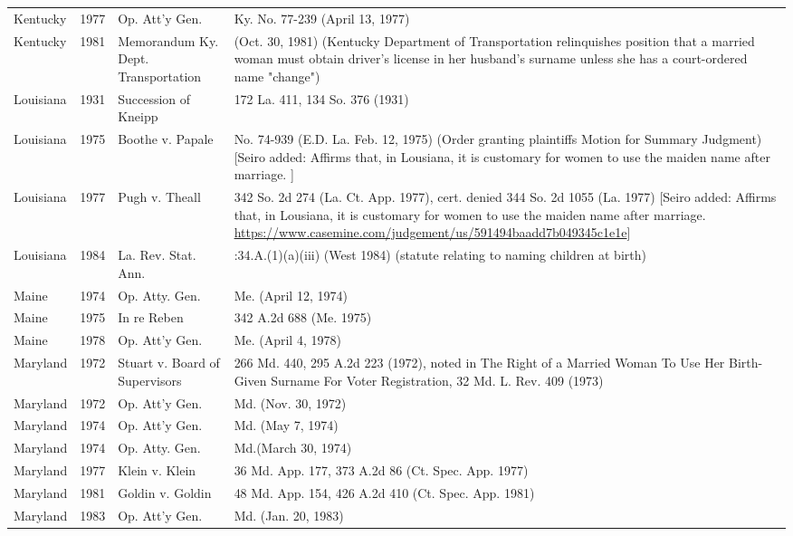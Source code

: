 \begin{longtable}{>{\hfill\footnotesize }p{2.5cm}<{}>{\footnotesize }p{0.75cm}<{}>{\footnotesize }p{4cm}<{}>{\footnotesize }p{6cm}<{}}
Kentucky & 1977 & Op. Att'y Gen. & Ky. No. 77-239 (April 13, 1977)\\\rowcolor{gray90}
Kentucky & 1981 & Memorandum Ky. Dept. Transportation & (Oct. 30, 1981) (Kentucky Department of Transportation relinquishes position that a married woman must obtain driver's license in her husband's surname unless she has a court-ordered name "change")\\
Louisiana & 1931 & Succession of Kneipp & 172 La. 411, 134 So. 376 (1931)\\\rowcolor{gray90}
Louisiana & 1975 & Boothe v. Papale & No. 74-939 (E.D. La. Feb. 12, 1975) (Order granting plaintiffs Motion for Summary Judgment) [Seiro added: Affirms that, in Lousiana, it is customary for women to use the maiden name after marriage. \citep[][fn 54]{Gorence1976}]\\
Louisiana & 1977 & Pugh v. Theall & 342 So. 2d 274 (La. Ct. App. 1977), cert. denied 344 So. 2d 1055 (La. 1977) [Seiro added: Affirms that, in Lousiana, it is customary for women to use the maiden name after marriage. \url{https://www.casemine.com/judgement/us/591494baadd7b049345c1e1e}]\\\rowcolor{gray90}
Louisiana & 1984 & La. Rev. Stat. Ann. & \textsection 40:34.A.(1)(a)(iii) (West 1984) (statute relating to naming children at birth)\\
Maine & 1974 & Op. Atty. Gen. & Me. (April 12, 1974)\\\rowcolor{gray90}
Maine & 1975 & In re Reben & 342 A.2d 688 (Me. 1975)\\
Maine & 1978 & Op. Att'y Gen. & Me. (April 4, 1978)\\\rowcolor{gray90}
Maryland & 1972 & Stuart v. Board of Supervisors & 266 Md. 440, 295 A.2d 223 (1972), noted in The Right of a Married Woman To Use Her Birth-Given Surname For Voter Registration, 32 Md. L. Rev. 409 (1973)\\
Maryland & 1972 & Op. Att'y Gen. & Md. (Nov. 30, 1972)\\\rowcolor{gray90}
Maryland & 1974 & Op. Att'y Gen. & Md. (May 7, 1974)\\
Maryland & 1974 & Op. Atty. Gen. & Md.(March 30, 1974)\\\rowcolor{gray90}
Maryland & 1977 & Klein v. Klein & 36 Md. App. 177, 373 A.2d 86 (Ct. Spec. App. 1977)\\
Maryland & 1981 & Goldin v. Goldin & 48 Md. App. 154, 426 A.2d 410 (Ct. Spec. App. 1981)\\\rowcolor{gray90}
Maryland & 1983 & Op. Att'y Gen. & Md. (Jan. 20, 1983)\\

\end{longtable}
